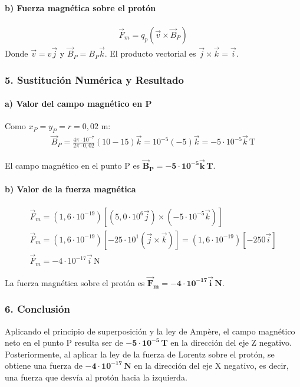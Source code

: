 \paragraph*{b) Fuerza magnética sobre el protón}
\begin{gather}
    \vec{F}_m = q_p (\vec{v} \times \vec{B}_P)
\end{gather}
Donde $\vec{v} = v \vec{j}$ y $\vec{B}_P = B_P \vec{k}$. El producto vectorial es $\vec{j} \times \vec{k} = \vec{i}$.

\subsubsection*{5. Sustitución Numérica y Resultado}
\paragraph*{a) Valor del campo magnético en P}
Como $x_P = y_P = r = 0,02$ m:
\begin{gather}
    \vec{B}_P = \frac{4\pi \cdot 10^{-7}}{2\pi \cdot 0,02} (10 - 15) \vec{k} = 10^{-5} (-5) \vec{k} = -5 \cdot 10^{-5} \vec{k} \, \text{T}
\end{gather}
\begin{cajaresultado}
    El campo magnético en el punto P es $\boldsymbol{\vec{B}_P = -5 \cdot 10^{-5} \vec{k} \, T}$.
\end{cajaresultado}

\paragraph*{b) Valor de la fuerza magnética}
\begin{gather}
    \vec{F}_m = (1,6 \cdot 10^{-19}) \left[ (5,0 \cdot 10^6 \vec{j}) \times (-5 \cdot 10^{-5} \vec{k}) \right] \nonumber \\
    \vec{F}_m = (1,6 \cdot 10^{-19}) \left[ -25 \cdot 10^1 (\vec{j} \times \vec{k}) \right] = (1,6 \cdot 10^{-19}) [-250 \vec{i}] \nonumber \\
    \vec{F}_m = -4 \cdot 10^{-17} \vec{i} \, \text{N}
\end{gather}
\begin{cajaresultado}
    La fuerza magnética sobre el protón es $\boldsymbol{\vec{F}_m = -4 \cdot 10^{-17} \vec{i} \, N}$.
\end{cajaresultado}

\subsubsection*{6. Conclusión}
\begin{cajaconclusion}
    Aplicando el principio de superposición y la ley de Ampère, el campo magnético neto en el punto P resulta ser de $\mathbf{-5 \cdot 10^{-5} \, T}$ en la dirección del eje Z negativo. Posteriormente, al aplicar la ley de la fuerza de Lorentz sobre el protón, se obtiene una fuerza de $\mathbf{-4 \cdot 10^{-17} \, N}$ en la dirección del eje X negativo, es decir, una fuerza que desvía al protón hacia la izquierda.
\end{cajaconclusion}

